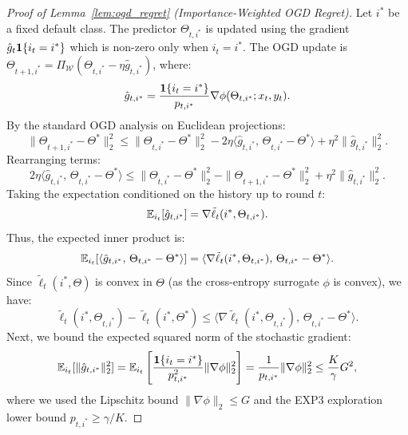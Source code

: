 \label{app:proof_ogd_regret}
\begin{proof}[Proof of Lemma~\ref{lem:ogd_regret} (Importance-Weighted OGD Regret)]
Let $i^*$ be a fixed default class. The predictor $\Theta_{t, i^*}$ is updated using the gradient $\hat{g}_t \mathbf{1}\{i_t = i^*\}$ which is non-zero only when $i_t = i^*$. The OGD update is $\Theta_{t+1, i^*} = \Pi_{\mathcal{W}}\left( \Theta_{t, i^*} - \eta \hat{g}_{t, i^*} \right)$, where:
\begin{equation}
    \hat{g}_{t, i^*} = \frac{\mathbf{1}\{i_t = i^*\}}{p_{t, i^*}} \nabla \phi(\Theta_{t, i^*}; x_t, y_t).
\end{equation}
By the standard OGD analysis on Euclidean projections:
\begin{equation}
    \|\Theta_{t+1, i^*} - \Theta^*\|_2^2 \le \|\Theta_{t, i^*} - \Theta^*\|_2^2 - 2\eta \langle \hat{g}_{t, i^*}, \, \Theta_{t, i^*} - \Theta^* \rangle + \eta^2 \|\hat{g}_{t, i^*}\|_2^2.
\end{equation}
Rearranging terms:
\begin{equation}
    2\eta \langle \hat{g}_{t, i^*}, \, \Theta_{t, i^*} - \Theta^* \rangle \le \|\Theta_{t, i^*} - \Theta^*\|_2^2 - \|\Theta_{t+1, i^*} - \Theta^*\|_2^2 + \eta^2 \|\hat{g}_{t, i^*}\|_2^2.
\end{equation}
Taking the expectation conditioned on the history up to round $t$:
\begin{equation}
    \mathbb{E}_{i_t}[\hat{g}_{t, i^*}] = \nabla \tilde{\ell}_t(i^*, \Theta_{t, i^*}).
\end{equation}
Thus, the expected inner product is:
\begin{equation}
    \mathbb{E}_{i_t}[\langle \hat{g}_{t, i^*}, \, \Theta_{t, i^*} - \Theta^* \rangle] = \langle \nabla \tilde{\ell}_t(i^*, \Theta_{t, i^*}), \, \Theta_{t, i^*} - \Theta^* \rangle.
\end{equation}
Since $\tilde{\ell}_t(i^*, \Theta)$ is convex in $\Theta$ (as the cross-entropy surrogate $\phi$ is convex), we have:
\begin{equation}
    \tilde{\ell}_t(i^*, \Theta_{t, i^*}) - \tilde{\ell}_t(i^*, \Theta^*) \le \langle \nabla \tilde{\ell}_t(i^*, \Theta_{t, i^*}), \, \Theta_{t, i^*} - \Theta^* \rangle.
\end{equation}
Next, we bound the expected squared norm of the stochastic gradient:
\begin{equation}
    \mathbb{E}_{i_t}[\|\hat{g}_{t, i^*}\|_2^2] = \mathbb{E}_{i_t}\left[ \frac{\mathbf{1}\{i_t = i^*\}}{p_{t, i^*}^2} \|\nabla \phi\|_2^2 \right] = \frac{1}{p_{t, i^*}} \|\nabla \phi\|_2^2 \le \frac{K}{\gamma} G^2,
\end{equation}
where we used the Lipschitz bound $\|\nabla \phi\|_2 \le G$ and the EXP3 exploration lower bound $p_{t, i^*} \ge \gamma/K$.


\end{proof}
